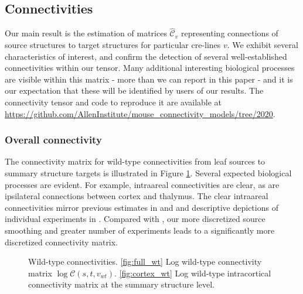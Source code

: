 
\newpage

\subsection{Connectivities}

Our main result is the estimation of matrices $\hat {\mathcal C}_v$ representing connections of source structures to target structures for particular cre-lines $v$. 
We exhibit several characteristics of interest, and confirm the detection of several well-established connectivities within our tensor.
Many additional interesting biological processes are visible within this matrix - more than we can report in this paper - and it is our expectation that these will be identified by users of our results.
The connectivity tensor and code to reproduce it are available at \url{https://github.com/AllenInstitute/mouse_connectivity_models/tree/2020}.

\subsubsection{Overall connectivity}

The connectivity matrix for wild-type connectivities from leaf sources to summary structure targets is illustrated in Figure \ref{fig:connectome}.
Several expected biological processes are evident.
For example, intraareal connectivities are clear, as are ipsilateral connections between cortex and thalymus.
The clear intraareal connectivities mirror previous estimates in \citet{Oh2014-kh} and \citet{Knox2019-ot} and descriptive depictions of individual experiments in \citet{Harris2019-mr}.
Compared with \citet{Knox2019-ot}, our more discretized source smoothing and greater number of experiments leads to a significantly more discretized connectivity matrix.

\newpage

\begin{figure}[H]
\centering
        \newline
   \caption{Wild-type connectivities.
   \ref{fig:full_wt} Log wild-type connectivity matrix $\log \mathcal {C} (s,t,v_{wt})$.
   \ref{fig:cortex_wt} Log wild-type intracortical connectivity matrix at the summary structure level.}
   \label{fig:connectome}
\end{figure}



